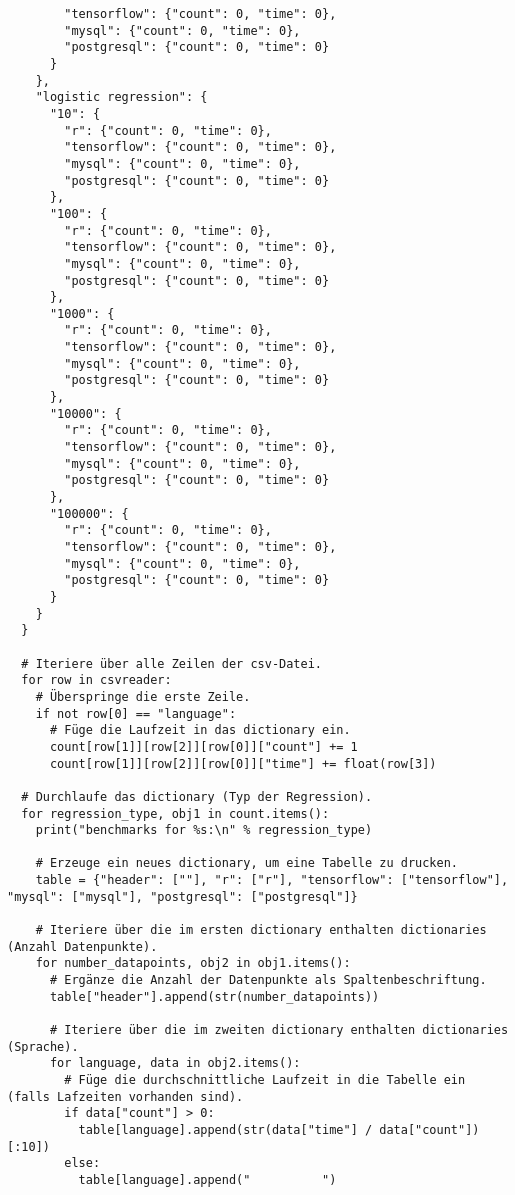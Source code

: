 \begin{verbatim}
        "tensorflow": {"count": 0, "time": 0},
        "mysql": {"count": 0, "time": 0},
        "postgresql": {"count": 0, "time": 0}
      }
    },
    "logistic regression": {
      "10": {
        "r": {"count": 0, "time": 0},
        "tensorflow": {"count": 0, "time": 0},
        "mysql": {"count": 0, "time": 0},
        "postgresql": {"count": 0, "time": 0}
      },
      "100": {
        "r": {"count": 0, "time": 0},
        "tensorflow": {"count": 0, "time": 0},
        "mysql": {"count": 0, "time": 0},
        "postgresql": {"count": 0, "time": 0}
      },
      "1000": {
        "r": {"count": 0, "time": 0},
        "tensorflow": {"count": 0, "time": 0},
        "mysql": {"count": 0, "time": 0},
        "postgresql": {"count": 0, "time": 0}
      },
      "10000": {
        "r": {"count": 0, "time": 0},
        "tensorflow": {"count": 0, "time": 0},
        "mysql": {"count": 0, "time": 0},
        "postgresql": {"count": 0, "time": 0}
      },
      "100000": {
        "r": {"count": 0, "time": 0},
        "tensorflow": {"count": 0, "time": 0},
        "mysql": {"count": 0, "time": 0},
        "postgresql": {"count": 0, "time": 0}
      }
    }
  }

  # Iteriere über alle Zeilen der csv-Datei.
  for row in csvreader:
    # Überspringe die erste Zeile.
    if not row[0] == "language":
      # Füge die Laufzeit in das dictionary ein.
      count[row[1]][row[2]][row[0]]["count"] += 1
      count[row[1]][row[2]][row[0]]["time"] += float(row[3])

  # Durchlaufe das dictionary (Typ der Regression).
  for regression_type, obj1 in count.items():
    print("benchmarks for %s:\n" % regression_type)

    # Erzeuge ein neues dictionary, um eine Tabelle zu drucken.
    table = {"header": [""], "r": ["r"], "tensorflow": ["tensorflow"], "mysql": ["mysql"], "postgresql": ["postgresql"]}

    # Iteriere über die im ersten dictionary enthalten dictionaries (Anzahl Datenpunkte).
    for number_datapoints, obj2 in obj1.items():
      # Ergänze die Anzahl der Datenpunkte als Spaltenbeschriftung.
      table["header"].append(str(number_datapoints))

      # Iteriere über die im zweiten dictionary enthalten dictionaries (Sprache).
      for language, data in obj2.items():
        # Füge die durchschnittliche Laufzeit in die Tabelle ein (falls Lafzeiten vorhanden sind).
        if data["count"] > 0:
          table[language].append(str(data["time"] / data["count"])[:10])
        else:
          table[language].append("          ")


\end{verbatim}
